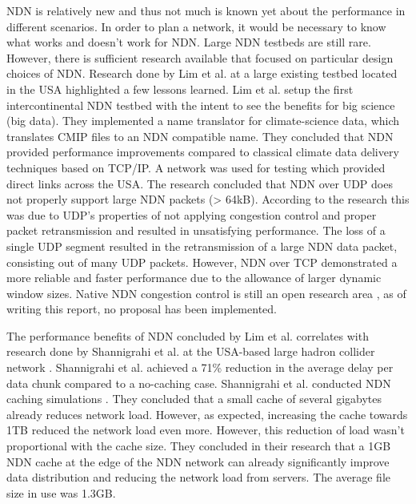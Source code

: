 NDN is relatively new and thus not much is known yet about the performance in different scenarios. In order to plan a network, it would be necessary to know what works and doesn't work for NDN. Large NDN testbeds are still rare. However, there is sufficient research available that focused on particular design choices of NDN. Research done by Lim et al. \cite{lim2018ndn} at a large existing testbed located in the USA \cite{ndn-testbed-status} highlighted a few lessons learned. Lim et al. setup the first intercontinental NDN testbed with the intent to see the benefits for big science (big data). They implemented a name translator for climate-science data, which translates CMIP files to an NDN compatible name. They concluded that NDN provided performance improvements compared to classical climate data delivery techniques based on TCP/IP. A network was used for testing which provided direct links across the USA. The research concluded that NDN over UDP does not properly support large NDN packets (> 64kB). According to the research this was due to UDP's properties of not applying congestion control and proper packet retransmission and resulted in unsatisfying performance. The loss of a single UDP segment resulted in the retransmission of a large NDN data packet, consisting out of many UDP packets. However, NDN over TCP demonstrated a more reliable and faster performance due to the allowance of larger dynamic window sizes. Native NDN congestion control is still an open research area \cite{ren2016congestion}, as of writing this report, no proposal has been implemented.

The performance benefits of NDN concluded by Lim et al. correlates with research done by Shannigrahi et al. at the USA-based large hadron collider network \cite{shannigrahi2015named}. Shannigrahi et al. achieved a 71\% reduction in the average delay per data chunk compared to a no-caching case. Shannigrahi et al. conducted NDN caching simulations \cite{shannigrahi2017request}. They concluded that a small cache of several gigabytes already reduces network load. However, as expected, increasing the cache towards 1TB reduced the network load even more. However, this reduction of load wasn't proportional with the cache size. They concluded in their research that a 1GB NDN cache at the edge of the NDN network can already significantly improve data distribution and reducing the network load from servers. The average file size in use was 1.3GB.

